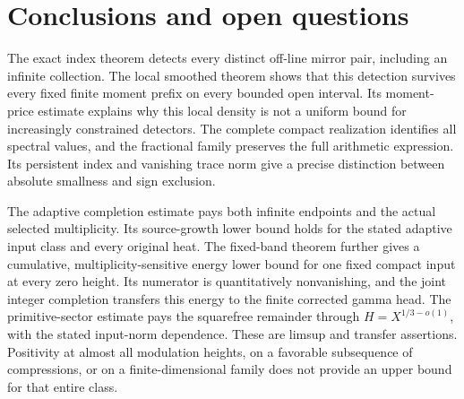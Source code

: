 \documentclass[11pt]{article}
\theoremstyle{remark}\newtheorem{remark}[theorem]{Remark}
\begin{document}
\section{Conclusions and open questions}\label{sec:conclusions}

The exact index theorem detects every distinct off-line mirror pair,
including an infinite collection. The local smoothed theorem shows
that this detection survives every fixed finite moment prefix on
every bounded open interval. Its moment-price estimate explains
why this local density is not a uniform bound for increasingly
constrained detectors. The complete compact realization identifies
all spectral values, and the fractional family preserves the full
arithmetic expression. Its persistent index and vanishing trace
norm give a precise distinction between absolute smallness and
sign exclusion.

The adaptive completion estimate pays both infinite endpoints and
the actual selected multiplicity. Its source-growth lower bound
holds for the stated adaptive input class and every original heat.
The fixed-band theorem further gives a cumulative, multiplicity-sensitive
energy lower bound for one fixed compact input at every zero height.
Its numerator is quantitatively nonvanishing, and the joint integer
completion transfers this energy to the finite corrected gamma head.
The primitive-sector estimate pays the squarefree remainder through
\(H=X^{1/3-o(1)}\), with the stated input-norm dependence.
These are limsup and transfer assertions. Positivity at almost all modulation
heights, on a favorable subsequence of compressions, or on a
finite-dimensional family does not provide an upper bound for
that entire class.
\end{document}
